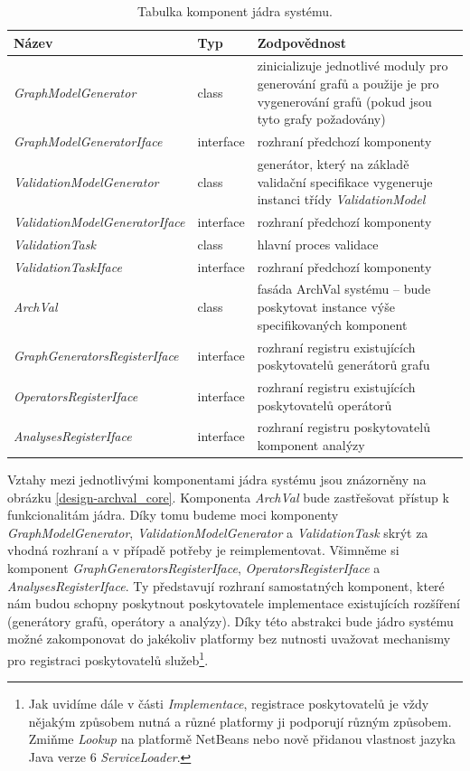 \begin{table}
  \caption{Tabulka komponent jádra systému. \label{design-archval_core_components}}
  \begin{center}
    \begin{tabular}{ | l | l | p{7.5cm} | }
      \hline
      \textbf{Název} & \textbf{Typ} & \textbf{Zodpovědnost} \\
      \hline
      \hline
      \emph{GraphModelGenerator} & class & zinicializuje jednotlivé moduly pro generování grafů a použije je pro vygenerování grafů (pokud jsou tyto grafy požadovány) \\ \hline
      \emph{GraphModelGeneratorIface} & interface & rozhraní předchozí komponenty \\ \hline
      \emph{ValidationModelGenerator} & class & generátor, který na základě validační specifikace vygeneruje instanci třídy \mbox{\emph{ValidationModel}} \\ \hline
      \emph{ValidationModelGeneratorIface} & interface & rozhraní předchozí komponenty \\ \hline
      \emph{ValidationTask} & class & hlavní proces validace \\ \hline
      \emph{ValidationTaskIface} & interface & rozhraní předchozí komponenty \\ \hline
      \hline
      \emph{ArchVal} & class & fasáda ArchVal systému -- bude poskytovat instance výše specifikovaných komponent \\ \hline
      \hline
      \emph{GraphGeneratorsRegisterIface} & interface & rozhraní registru existujících poskytovatelů generátorů grafu \\ \hline
      \emph{OperatorsRegisterIface} & interface & rozhraní registru existujících poskytovatelů operátorů \\ \hline
      \emph{AnalysesRegisterIface} & interface & rozhraní registru poskytovatelů komponent analýzy \\ \hline
    \end{tabular}
  \end{center}

\end{table}

Vztahy mezi jednotlivými komponentami jádra systému jsou znázorněny na obrázku \ref{design-archval_core}. Komponenta \emph{ArchVal} bude zastřešovat přístup k funkcionalitám jádra. Díky tomu budeme moci komponenty \emph{GraphModelGenerator}, \emph{ValidationModelGenerator} a \emph{ValidationTask} skrýt za vhodná rozhraní a v případě potřeby je reimplementovat. Všimněme si komponent \emph{GraphGeneratorsRegisterIface}, \emph{OperatorsRegisterIface} a \emph{AnalysesRegisterIface}. Ty představují rozhraní samostatných komponent, které nám budou schopny poskytnout poskytovatele implementace existujících rozšíření (generátory grafů, operátory a analýzy). Díky této abstrakci bude jádro systému možné zakomponovat do jakékoliv platformy bez nutnosti uvažovat mechanismy pro registraci poskytovatelů služeb\footnote{Jak uvidíme dále v části \emph{Implementace}, registrace poskytovatelů je vždy nějakým způsobem nutná a různé platformy ji podporují různým způsobem. Zmiňme \emph{Lookup} na platformě NetBeans nebo nově přidanou vlastnost jazyka Java verze 6 \emph{ServiceLoader}.}.

